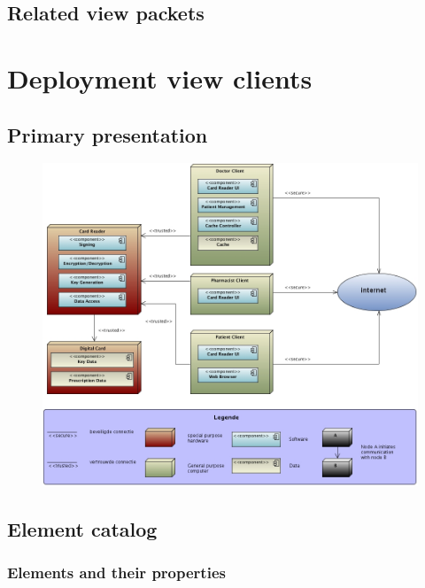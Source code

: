 \documentclass[a4paper,10pt]{book}
\begin{document}
\subsection{Related view packets}


\section{Deployment view clients}

\subsection{Primary presentation}
\begin{center}
    \begin{figure}
      \includegraphics[width=\textwidth]{../images/deployment_clients.jpg}
    \end{figure}
  \end{center}

\subsection{Element catalog}

\subsubsection{Elements and their properties}
\end{document}
